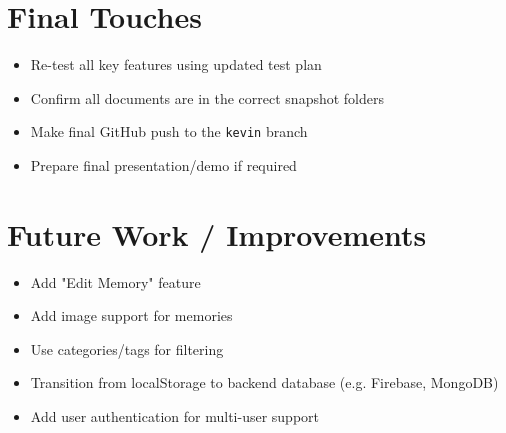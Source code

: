 \documentclass[12pt]{article}
\begin{document}
\section*{Final Touches}
\begin{itemize}
  \item Re-test all key features using updated test plan
  \item Confirm all documents are in the correct snapshot folders
  \item Make final GitHub push to the \texttt{kevin} branch
  \item Prepare final presentation/demo if required
\end{itemize}

\section*{Future Work / Improvements}
\begin{itemize}
  \item Add "Edit Memory" feature
  \item Add image support for memories
  \item Use categories/tags for filtering
  \item Transition from localStorage to backend database (e.g. Firebase, MongoDB)
  \item Add user authentication for multi-user support
\end{itemize}
\end{document}
